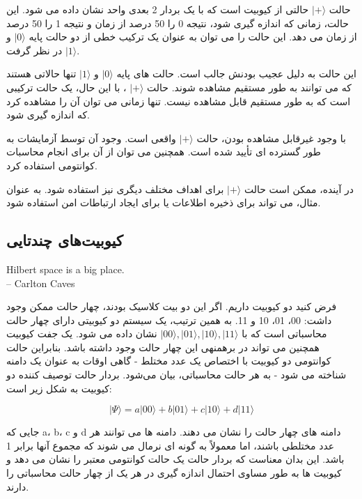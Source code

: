 \documentclass{book}
\begin{document}
حالت $\vert+\rangle$ حالتی از کیوبیت است که با یک بردار 2 بعدی واحد نشان داده می شود. این حالت، زمانی که اندازه گیری شود، نتیجه 0 را 50 درصد از زمان و نتیجه 1 را 50 درصد از زمان می دهد. این حالت را می توان به عنوان یک ترکیب خطی از دو حالت پایه $\vert0\rangle$ و $\vert 1 \rangle$ در نظر گرفت.

این حالت به دلیل عجیب بودنش جالب است. حالت های پایه $\vert 0 \rangle$ و $\vert 1 \rangle$ تنها حالاتی هستند که می توانند به طور مستقیم مشاهده شوند. حالت $\vert + \rangle$ ، با این حال، یک حالت ترکیبی است که به طور مستقیم قابل مشاهده نیست. تنها زمانی می توان آن را مشاهده کرد که اندازه گیری شود.

با وجود غیرقابل مشاهده بودن، حالت $\vert + \rangle$ واقعی است. وجود آن توسط آزمایشات به طور گسترده ای تأیید شده است. همچنین می توان از آن برای انجام محاسبات کوانتومی استفاده کرد.

در آینده، ممکن است حالت $\vert + \rangle$ برای اهداف مختلف دیگری نیز استفاده شود. به عنوان مثال، می تواند برای ذخیره اطلاعات یا برای ایجاد ارتباطات امن استفاده شود.
\pagebreak
\subsection{کیوبیت‌های چندتایی}

\begin{latin}
	Hilbert space is a big place.\\
	\hspace{2cm}– Carlton Caves
\end{latin}




فرض کنید دو کیوبیت داریم. اگر این دو بیت کلاسیک بودند، چهار حالت ممکن وجود داشت: 00، 01، 10 و 11. به همین ترتیب، یک سیستم دو کیوبیتی دارای چهار حالت محاسباتی است که با $\vert 00 \rangle, \vert 01 \rangle, \vert 10 \rangle, \vert 11 \rangle$ نشان داده می شود. یک جفت کیوبیت همچنین می تواند در برهمنهی این چهار حالت وجود داشته باشد.
بنابراین حالت کوانتومی دو کیوبیت با اختصاص یک عدد مختلط - گاهی اوقات به عنوان یک دامنه شناخته می شود - به هر حالت محاسباتی، بیان می‌شود. بردار حالت توصیف کننده دو کیوبیت به شکل زیر است:
\begin{center}
	\begin{equation}\label{two qubit system}
		\vert \Psi \rangle = a \vert00\rangle + b \vert01\rangle + c \vert10\rangle + d \vert11\rangle 
	\end{equation}
\end{center}

جایی که a، b، c و d دامنه های چهار حالت را نشان می دهند. دامنه ها می توانند هر عدد مختلطی باشند، اما معمولاً به گونه ای نرمال می شوند که مجموع آنها برابر 1 باشد. این بدان معناست که بردار حالت یک حالت کوانتومی معتبر را نشان می دهد و کیوبیت ها به طور مساوی احتمال اندازه گیری در هر یک از چهار حالت محاسباتی را دارند.
\end{document}
